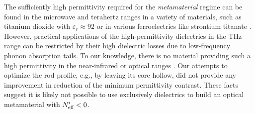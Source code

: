 The sufficiently high permittivity required for the \textit{metamaterial} regime can be found in the microwave and terahertz ranges in a variety of materials, such as titanium dioxide with $\varepsilon_r \approx 92$ \cite{nemec2009tunable} or in various ferroelectrics like strontium titanate \cite{skoromets2011tuning}. However, practical applications of the high-permittivity dielectrics in the THz range can be restricted by their high dielectric losses due to low-frequency phonon absorption tails. To our knowledge, there is no material providing such a high permittivity in the near-infrared or optical ranges \cite{jelinek2009artificial}. Our attempts to optimize the rod profile, e.g., by leaving its core hollow, did not provide any improvement in reduction of the minimum permittivity contrast. These facts suggest it is likely not possible to use exclusively dielectrics to build an optical metamaterial with $N_{\text{eff} }'<0$.

\FloatBarrier %

